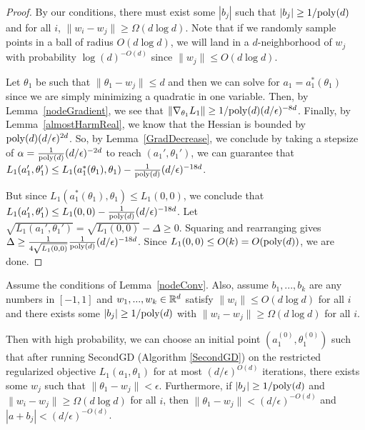 \begin{proof}
By our conditions, there must exist some $|b_j|$ such that $|b_j| \geq 1/\mathrm{poly}(d)$ and for all $i$, $\|w_i - w_j\| \geq \Omega(d\log d)$. Note that if we randomly sample points in a ball of radius $O(d\log d)$, we will land in a $d$-neighborhood of $w_j$ with probability $\log(d)^{-O(d)}$ since $\|w_j\|\leq O(d\log d)$. 

Let $\theta_1$ be such that $\|\theta_1 - w_j \| \leq d$ and then we can solve for $a_1 = a_1^*(\theta_1)$ since we are simply minimizing a quadratic in one variable. Then, by Lemma~\ref{nodeGradient}, we see that $\|\nabla_{\theta_1}L_1 \| \geq 1/\mathrm{poly}(d)(d/\epsilon)^{-8d}$. Finally, by Lemma~\ref{almostHarmReal}, we know that the Hessian is bounded by $\mathrm{poly}(d)(d/\epsilon)^{2d }$. So, by Lemma~\ref{GradDecrease}, we conclude by taking a stepsize of $\alpha = \frac{1}{\mathrm{poly}(d)}(d/\epsilon)^{-2d}$ to reach $(a_1',\theta_1')$, we can guarantee that $L_1(a_1', \theta_1') \leq L_1 (a_1^*(\theta_1), \theta_1) - \frac{1}{\mathrm{poly}(d)} (d/\epsilon)^{ -18d}$.

But since $L_1(a_1^*(\theta_1),\theta_1)\leq L_1(0,0)$, we conclude that $L_1(a_1', \theta_1') \leq L_1(0,0) -  \frac{1}{\mathrm{poly}(d)} (d/\epsilon)^{ -18d}$. Let $\sqrt{L_1(a_1', \theta_1')} = \sqrt{L_1(0,0)} - \Delta \geq 0$. Squaring and rearranging gives $\Delta \geq \frac{1}{4\sqrt{L_1( 0, 0)}}  \frac{1}{\mathrm{poly}(d)}(d/\epsilon)^{ -18d} $. Since $L_1(0,0) \leq O(k) = O(\mathrm{poly}(d))$, we are done. 

\end{proof}
%
\begin{lemma}\label{nodewiseSGD}
Assume the conditions of Lemma~\ref{nodeConv}. Also, assume $b_1,...,b_k$ are any numbers in $[-1,1]$ and $w_1,...,w_k \in {\mathbb{R}}^d$ satisfy $\|w_i\|\leq O(d\log d)$ for all $i$ and there exists some $|b_j| \geq 1/\mathrm{poly}(d)$ with $\|w_i - w_j\| \geq \Omega(d\log d)$ for all $i$.

Then with high probability, we can choose an initial point $(a_1^{(0)}, \theta_1^{(0)})$ such that after running SecondGD (Algorithm \ref{SecondGD}) on the restricted regularized objective $L_1(a_1,\theta_1)$ for at most $(d/\epsilon)^{O(d)}$ iterations, there exists some $w_j$ such that $\|\theta_1 - w_j\| < \epsilon$. Furthermore, if $|b_j| \geq 1/\mathrm{poly}(d)$ and $\|w_i - w_j\| \geq \Omega(d\log d)$ for all $i$, then $\|\theta_1 - w_j\| < (d/\epsilon)^{-O(d)}$ and $|a + b_j| < (d/\epsilon)^{-O(d)}$.
\end{lemma}


